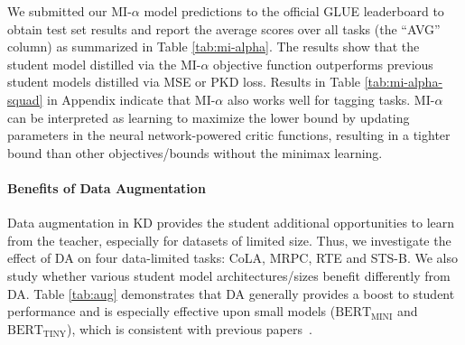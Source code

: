\documentclass[11pt]{article}
\begin{document}
We submitted our MI-$\alpha$ model predictions to the official GLUE leaderboard to obtain test set results and report the average scores over all tasks (the ``AVG'' column) as summarized in Table \ref{tab:mi-alpha}. The results show that the student model distilled via the MI-$\alpha$ objective function outperforms previous student models distilled via MSE or PKD loss.
Results in Table \ref{tab:mi-alpha-squad} in Appendix indicate that MI-$\alpha$ also works well for tagging tasks. MI-$\alpha$ can be interpreted as learning to maximize the lower bound by updating parameters in the neural network-powered critic functions, resulting in a tighter bound than other objectives/bounds without the minimax learning.






\paragraph{Benefits of Data Augmentation}
\label{sec: DA benefit}
Data augmentation in KD provides the student additional opportunities to learn from the teacher, especially for datasets of limited size. Thus, we investigate the effect of DA on four data-limited tasks: CoLA, MRPC, RTE and STS-B. 
We also study whether various student model architectures/sizes benefit differently from DA. Table \ref{tab:aug} demonstrates that DA generally provides a boost to student performance and is especially effective upon small models ($\text{BERT}_\text{MINI}$ and $\text{BERT}_\text{TINY}$), which is consistent with previous papers~\citep{jiao2019tinybert}.
\end{document}
